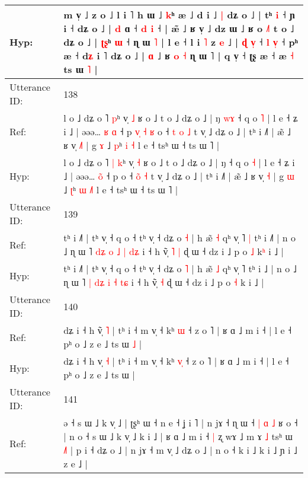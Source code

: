 \documentclass[10pt]{article}
\DeclareRobustCommand{\hl}[1]{{\textcolor{red}{#1}}}
\begin{document}
\begin{longtable}{ll}
 \\
Hyp: & m v̩ ˩ z o ˩ l i ˥ h ɯ ˩ \hl{k}ʰ æ ˩ d i ˩\hl{ }\hl{|} dʑ o ˩ | tʰ \hl{}\hl{i} ˧ ɲ i ˧ dʑ o ˩ | \hl{d} ɑ ˧ \hl{d} \hl{i} ˧ | æ̃ ˩ ʁ v̩ ˩ dz ɯ ˩ ʁ o \hl{˩}˥ t o ˩ dʑ o ˩ | \hl{ʈ}\hl{ʂ}ʰ \hl{}\hl{ɯ} ˧ ɳ ɯ \hl{˥} | l e ˧ l i \hl{˥} z \hl{e} ˩ |\hl{}\hl{}\hl{}\hl{}\hl{}\hl{}\hl{}\hl{} \hl{ɖ} \hl{}\hl{v}\hl{̩} ˧ \hl{l} \hl{v}\hl{̩} ˧ pʰ æ ˧ d\hl{ʑ} i ˥ dʑ o ˩ | \hl{}\hl{ɑ} ˩ ʁ \hl{}\hl{o} \hl{˧} ɳ ɯ ˥ | q v̩ ˧ ʈʂ æ ˧ æ \hl{˧} ts ɯ \hl{˥} |
 \\
\midrule
Utterance ID: & 138 \\
Ref: & l o ˩ dʑ o ˥\hl{}\hl{} \hl{p}ʰ v̩ \hl{˩} ʁ o ˩ t o ˩ dʑ o ˩ | ŋ\hl{ }\hl{w}\hl{ɤ} ˧ q o \hl{˥} | l e ˧ ʑ i ˩ | əəə… \hl{ʁ}\hl{ }\hl{ɑ} ˧ p\hl{ }\hl{v}\hl{̩}\hl{ }\hl{˧}\hl{ }\hl{ʁ} o ˧ \hl{t}\hl{ }\hl{o} \hl{˩} t v̩ ˩ dʑ o ˩ | tʰ i ˩˥ | æ̃ ˩ ʁ v̩ \hl{˩}\hl{˥} | g \hl{ɤ} ˩ \hl{p}ʰ \hl{i} \hl{}\hl{˧} l e ˧ tsʰ ɯ ˧ ts ɯ ˥ |
 \\
Hyp: & l o ˩ dʑ o ˥\hl{ }\hl{|} \hl{k}ʰ v̩ \hl{˧} ʁ o ˩ t o ˩ dʑ o ˩ | ŋ\hl{}\hl{}\hl{} ˧ q o \hl{˧} | l e ˧ ʑ i ˩ | əəə… \hl{}\hl{o}\hl{̃} ˧ p\hl{}\hl{}\hl{}\hl{}\hl{}\hl{}\hl{} o ˧ \hl{}\hl{o}\hl{̃} \hl{˧} t v̩ ˩ dʑ o ˩ | tʰ i ˩˥ | æ̃ ˩ ʁ v̩ \hl{}\hl{˧} | g \hl{ɯ} ˩ \hl{ʈ}ʰ \hl{ɯ} \hl{˩}\hl{˥} l e ˧ tsʰ ɯ ˧ ts ɯ ˥ |
 \\
\midrule
Utterance ID: & 139 \\
Ref: & tʰ i ˩˥ | tʰ v̩ ˧ q o ˧ tʰ v̩ ˧ dʑ o \hl{˧} | h æ̃ \hl{˧} qʰ v̩ ˥\hl{ }\hl{|} tʰ i ˩\hl{˥} | n o ˩ ɳ ɯ ˥ \hl{d}\hl{ʑ}\hl{ }\hl{o} \hl{˩} \hl{|} \hl{d}\hl{ʑ} i ˧ h ṽ̩\hl{ }\hl{˥} \hl{|} ɖ ɯ ˧ dz i ˩ p o \hl{˩} k\hl{ʰ} i ˩ |
 \\
Hyp: & tʰ i ˩˥ | tʰ v̩ ˧ q o ˧ tʰ v̩ ˧ dʑ o \hl{˥} | h æ̃ \hl{˩} qʰ v̩ ˥\hl{}\hl{} tʰ i ˩\hl{} | n o ˩ ɳ ɯ ˥ \hl{|}\hl{ }\hl{d}\hl{ʑ} \hl{i} \hl{˧} \hl{t}\hl{ɕ} i ˧ h ṽ̩\hl{}\hl{} \hl{˧} ɖ ɯ ˧ dz i ˩ p o \hl{˧} k\hl{} i ˩ |
 \\
\midrule
Utterance ID: & 140 \\
Ref: & dʑ i ˧ h v\hl{̃}̩ \hl{˥} | tʰ i ˧ m v̩ ˧ kʰ \hl{}\hl{ɯ} ˧ z o ˥ | ʁ ɑ ˩ m i ˧ | l e ˧ pʰ o ˩ z e ˩ ts ɯ\hl{ }\hl{˩} |
 \\
Hyp: & dʑ i ˧ h v\hl{}̩ \hl{˧} | tʰ i ˧ m v̩ ˧ kʰ \hl{v}\hl{̩} ˧ z o ˥ | ʁ ɑ ˩ m i ˧ | l e ˧ pʰ o ˩ z e ˩ ts ɯ\hl{}\hl{} |
 \\
\midrule
Utterance ID: & 141 \\
Ref: & ə ˧ s ɯ ˩ k v̩ ˩ | ʈʂʰ ɯ ˧ n e ˧ ʝ i ˥ | n jɤ ˧ ɳ ɯ ˧\hl{ }\hl{|} \hl{ɑ} \hl{˩} ʁ o ˧ | n o ˧ s ɯ ˩ k v̩ ˩ k i ˩ | ʁ ɑ ˩ m i ˧\hl{ }\hl{|} ʐ wɤ ˩\hl{}\hl{} m ɤ \hl{˩} tsʰ ɯ \hl{˩}˥ | p i ˧ dʑ o ˩ | n jɤ ˧ m v̩ ˩ dʑ o ˩ | n o ˧ k i ˩ k i ˩ ɲ i ˩ z e ˩ |

\end{longtable}
\end{document}
